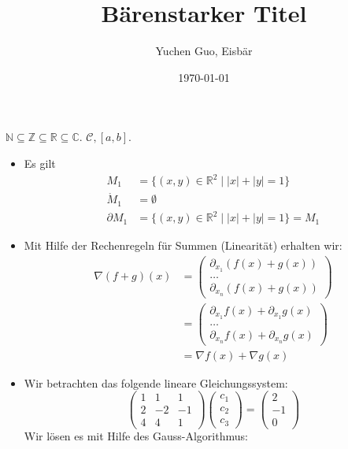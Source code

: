 \documentclass{article}
\title{Bärenstarker Titel}
\author{Yuchen Guo, Eisbär}
\date{\today}
\newcommand{\R}{\mathbb{R}}
\newcommand{\N}{\mathbb{N}}
\newcommand{\Z}{\mathbb{Z}}
\newcommand{\C}{\mathbb{C}}
\newcommand\borel[1]{\mathcal{#1}}
\newcommand\caratheo[2]{\left[#1,#2\right]}
\begin{document}
\maketitle
\tableofcontents
\(\N \subseteq \Z \subseteq \R \subseteq \C\). \(\borel{C}, \caratheo{a}{b}\).
\begin{itemize}
\item Es gilt
  \begin{align*}
    M_{1} &= \{(x, y) \in \mathbb{R}^{2} \mid |x| + |y| = 1\} \\
    \mathring{M}_{1} & = \emptyset \\
    \partial M_{1} &= \{(x, y) \in \mathbb{R}^{2} \mid |x| + |y| = 1\} = M_{1}
  \end{align*}
\item Mit Hilfe der Rechenregeln für Summen (Linearität) erhalten wir:
  \begin{align*}
    \nabla(f+g)(x)
    &=
      \begin{pmatrix}
        \partial_{x_{1}}(f(x)+g(x)) \\
        \ldots \\
        \partial_{x_{n}}(f(x)+g(x))
      \end{pmatrix} \\
    &=    \begin{pmatrix}
      \partial_{x_{1}}f(x)+\partial_{x_{1}}g(x) \\
      \ldots \\
      \partial_{x_{n}}f(x)+\partial_{x_{n}}g(x)
    \end{pmatrix} \\
    &= \nabla f(x) + \nabla g(x)
  \end{align*}
\item Wir betrachten das folgende lineare Gleichungssystem:
  \[
    \begin{pmatrix}
      1 & 1 & 1 \\ 2 & -2 & -1 \\ 4 & 4 & 1
    \end{pmatrix}
    \begin{pmatrix}
      c_{1} \\ c_{2} \\ c_{3}
    \end{pmatrix}
    =
    \begin{pmatrix}
      2 \\ -1 \\ 0
    \end{pmatrix}
  \]
  Wir lösen es mit Hilfe des Gauss-Algorithmus:
  \begin{align*}

\end{align*}
\end{itemize}
\end{document}
